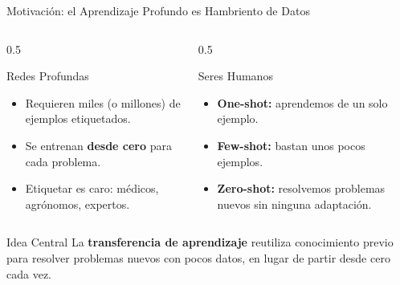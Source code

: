 \documentclass[aspectratio=169, 10pt]{beamer}
\begin{document}
\begin{frame}{Motivaci\'on: el Aprendizaje Profundo es Hambriento de Datos}

	\begin{columns}[T]
		\begin{column}{0.5\textwidth}
			\begin{block}{Redes Profundas}
				\begin{itemize}
					\item Requieren miles (o millones) de ejemplos etiquetados.
					\item Se entrenan \textbf{desde cero} para cada problema.
					\item Etiquetar es caro: m\'edicos, agr\'onomos, expertos.
				\end{itemize}
			\end{block}
		\end{column}

		\begin{column}{0.5\textwidth}
			\begin{block}{Seres Humanos}
				\begin{itemize}
					\item \textbf{One-shot:} aprendemos de un solo ejemplo.
					\item \textbf{Few-shot:} bastan unos pocos ejemplos.
					\item \textbf{Zero-shot:} resolvemos problemas nuevos sin ninguna adaptaci\'on.
				\end{itemize}
			\end{block}
		\end{column}
	\end{columns}

	\vspace{0.4cm}

	\begin{alertblock}{Idea Central}
		La \textbf{transferencia de aprendizaje} reutiliza conocimiento previo para resolver problemas nuevos con pocos datos, en lugar de partir desde cero cada vez.
	\end{alertblock}

\end{frame}
\end{document}
